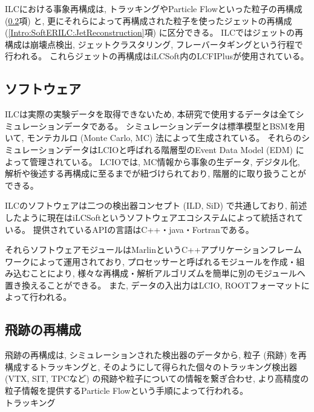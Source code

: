 ILCにおける事象再構成は, トラッキングやParticle Flowといった粒子の再構成 (\ref{Intro:SoftERILC:ParticleReconstruction}項) と, 更にそれらによって再構成された粒子を使ったジェットの再構成 (\ref{Intro:SoftERILC:JetReconstruction}項) に区分できる。
ILCではジェットの再構成は崩壊点検出, ジェットクラスタリング, フレーバータギングという行程で行われる。
これらジェットの再構成はiLCSoft内のLCFIPlus\cite{LCFIPlus}が使用されている。


\subsection{ソフトウェア} \label{Intro:SoftERILC:Software}

ILCは実際の実験データを取得できないため, 本研究で使用するデータは全てシミュレーションデータである。
シミュレーションデータは標準模型とBSMを用いて, モンテカルロ (Monte Carlo, MC) 法によって生成されている。
それらのシミュレーションデータはLCIOと呼ばれる階層型のEvent Data Model (EDM) によって管理されている。
LCIOでは, MC情報から事象の生データ, デジタル化, 解析や後述する再構成に至るまでが紐づけられており, 階層的に取り扱うことができる。

ILCのソフトウェアは二つの検出器コンセプト (ILD, SiD) で共通しており, 前述したように現在はiLCSoftというソフトウェアエコシステムによって統括されている。
提供されているAPIの言語はC++・java・Fortranである。

それらソフトウェアモジュールはMarlin\cite{Marlinpaper}というC++アプリケーションフレームワークによって運用されており, プロセッサーと呼ばれるモジュールを作成・組み込むことにより, 様々な再構成・解析アルゴリズムを簡単に別のモジュールへ置き換えることができる。
また, データの入出力はLCIO, ROOTフォーマットによって行われる。


\subsection{飛跡の再構成} \label{Intro:SoftERILC:ParticleReconstruction}

飛跡の再構成は, シミュレーションされた検出器のデータから, 粒子 (飛跡) を再構成するトラッキングと, そのようにして得られた個々のトラッキング検出器 (VTX, SIT, TPCなど) の飛跡や粒子についての情報を繋ぎ合わせ, より高精度の粒子情報を提供するParticle Flowという手順によって行われる。\\
\newpage
トラッキング\\

